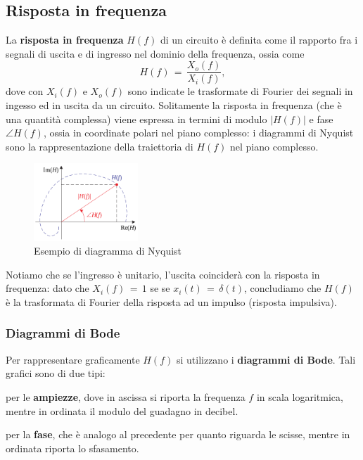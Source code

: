 \subsection{Risposta in frequenza}

La \textbf{risposta in frequenza} $H\left(f\right)$ di un circuito è definita come il rapporto fra i segnali di uscita e di
ingresso nel dominio della frequenza, ossia come
\begin{equation}
    H\left(f\right)\,=\,\frac{X_o(f)}{X_i(f)},
    \label{equation: rispostaFrequenza}
\end{equation}
dove con $X_i\left(f\right)$ e $X_o\left(f\right)$ sono indicate le trasformate di Fourier dei segnali in ingesso ed in uscita 
da un circuito. Solitamente la risposta in frequenza (che è una quantità complessa) viene espressa in termini di modulo 
$|H\left(f\right)|$ e fase $\angle H\left(f\right)$, ossia in coordinate polari nel piano complesso: i diagrammi di Nyquist 
sono la rappresentazione della traiettoria di $H\left(f\right)$ nel piano complesso.
\begin{figure}[H]
    \centering
    \includegraphics[width=0.35\textwidth]{Immagini/DiagrammaNyquist.png}
    \caption{Esempio di diagramma di Nyquist}
    \label{figure: Impedenza}
\end{figure}
Notiamo che se l'ingresso è unitario, l'uscita coinciderà con la risposta in frequenza: dato che $X_i\left(f\right)\,=\,1$ se
se $x_i\left(t\right)\,=\,\delta\left(t\right)$, concludiamo che $H\left(f\right)$ è la trasformata di Fourier della risposta
ad un impulso (risposta impulsiva).

\subsubsection{Diagrammi di Bode}

Per rappresentare graficamente $H\left(f\right)$ si utilizzano i \textbf{diagrammi di Bode}. Tali grafici sono di due tipi:
\begin{list}{\textbf{-}}{\setlength{\itemsep}{0cm}}
    \item per le \textbf{ampiezze}, dove in ascissa si riporta la frequenza $f$ in scala logaritmica, mentre in ordinata il
          modulo del guadagno in decibel.
    \item per la \textbf{fase}, che è analogo al precedente per quanto riguarda le scisse, mentre in ordinata riporta lo 
          sfasamento.
\end{list}

